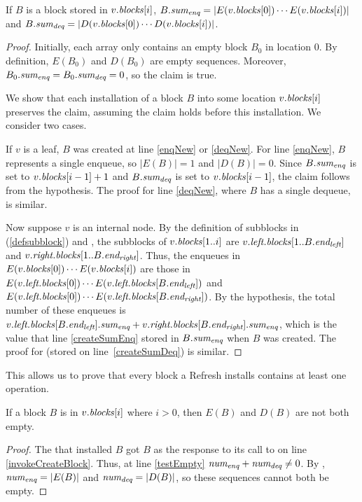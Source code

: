 \begin{invariant}\label{lem::sum}
If $B$ is a block stored in $v.\mbox{\textit{blocks}}[i]$,
$B.\mbox{\textit{sum\textsubscript{enq}}} = | E(v.\mbox{\textit{blocks}}[0])\cdots E(v.\mbox{\textit{blocks}}[i]) |$ and
$B.\mbox{\textit{sum\textsubscript{deq}}} = | D(v.\mbox{\textit{blocks}}[0])\cdots D(v.\mbox{\textit{blocks}}[i]) |$.
\end{invariant}
\begin{proof}
Initially, each  array only contains an empty block $B_0$ in location 0.
By definition, $E(B_0)$ and $D(B_0)$ are empty sequences.
Moreover, $B_0.\mbox{\textit{sum\textsubscript{enq}}} = B_0.\mbox{\textit{sum\textsubscript{deq}}} = 0$, so the claim is true.

We show that each installation of a block $B$ into some location $v.\mbox{\textit{blocks}}[i]$ preserves the claim,
assuming the claim holds before this installation.  We consider two cases.

If $v$ is a leaf, $B$ was created at line \ref{enqNew} or \ref{deqNew}.
For line \ref{enqNew}, $B$ represents a single enqueue, so $|E(B)|=1$ and $|D(B)|=0$.
Since $B.\mbox{\textit{sum\textsubscript{enq}}}$ is set to $v.\mbox{\textit{blocks}}[i-1]+1$ and
$B.\mbox{\textit{sum\textsubscript{deq}}}$ is set to $v.\mbox{\textit{blocks}}[i-1]$, the claim follows from the hypothesis.
The proof for line \ref{deqNew}, where $B$ has a single dequeue, is similar.

Now suppose $v$ is an internal node. By the definition of subblocks in (\ref{defsubblock}) and , the
subblocks of $v.\mbox{\textit{blocks}}[1..i]$ are $v.\mbox{\textit{left.blocks}}[1..B.\mbox{\textit{end\textsubscript{left}}}]$ 
and $v.\mbox{\textit{right.blocks}}[1..B.\mbox{\textit{end\textsubscript{right}}}]$.
Thus, the enqueues in $E(v.\mbox{\textit{blocks}}[0])\cdots E(v.\mbox{\textit{blocks}}[i])$ are those in
$E(v.\mbox{\textit{left.blocks}}[0]) \cdots E(v.\mbox{\textit{left.blocks}}[B.\mbox{\textit{end\textsubscript{left}}}])$ and
$E(v.\mbox{\textit{left.blocks}}[0]) \cdots E(v.\mbox{\textit{left.blocks}}[B.\mbox{\textit{end\textsubscript{right}}}])$.
By the hypothesis, the total number of these enqueues is $v.\mbox{\textit{left.blocks}}[B.\mbox{\textit{end\textsubscript{left}}}].\mbox{\textit{sum\textsubscript{enq}}} + v.\mbox{\textit{right.blocks}}[B.\mbox{\textit{end\textsubscript{right}}}].\mbox{\textit{sum\textsubscript{enq}}}$, which is the value that line \ref{createSumEnq} stored in $B.\mbox{\textit{sum\textsubscript{enq}}}$ when $B$ was created.
The proof for  (stored on line~\ref{createSumDeq}) is similar.
\end{proof}

This allows us to prove that every block a Refresh installs contains at least one operation.

\begin{corollary}\label{blockNotEmpty}
If a block $B$ is in $v.\mbox{\textit{blocks}}[i]$ where $i>0$, then $E(B)$ and $D(B)$ are not both empty.
\end{corollary}
\begin{proof}
The  that installed $B$ got $B$ as the response to its call to  on line \ref{invokeCreateBlock}.
Thus, at line \ref{testEmpty} $\mbox{\textnormal{\textit{num\textsubscript{enq}}}}+\mbox{\textnormal{\textit{num\textsubscript{deq}}}}\neq 0$.
By , $\mbox{\textnormal{\textit{num\textsubscript{enq}}}} = |E(B)|$ and $\mbox{\textnormal{\textit{num\textsubscript{deq}}}} = |D(B)|$,
so these sequences cannot both be empty.
\end{proof}



